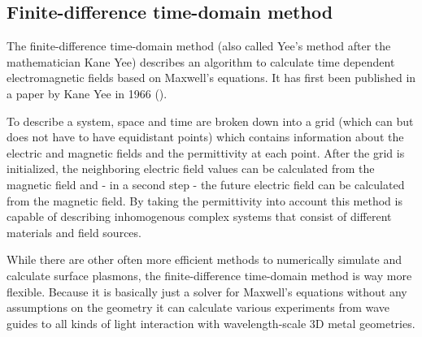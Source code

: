 \subsection{Finite-difference time-domain method}

The finite-difference time-domain method (also called Yee's method after the mathematician Kane Yee) describes an algorithm to calculate time dependent electromagnetic fields based on Maxwell's equations. It has first been published in a paper by Kane Yee in 1966\cite{yee} ().

To describe a system, space and time are broken down into a grid (which can but does not have to have equidistant points) which contains information about the electric and magnetic fields and the permittivity at each point. After the grid is initialized, the neighboring electric field values can be calculated from the magnetic field and - in a second step - the future electric field can be calculated from the magnetic field. By taking the permittivity into account this method is capable of describing inhomogenous complex systems that consist of different materials and field sources.

While there are other often more efficient methods to numerically simulate and calculate surface plasmons, the finite-difference time-domain method is way more flexible. Because it is basically just a solver for Maxwell's equations without any assumptions on the geometry it can calculate various experiments from wave guides to all kinds of light interaction with wavelength-scale 3D metal geometries\cite{numel}.
